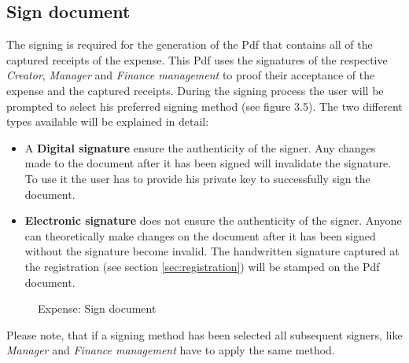 \subsection{Sign document}
\label{sec:signing}
The signing is required for the generation of the Pdf that contains all of the captured receipts of the expense. This Pdf uses the signatures of the respective \textit{Creator}, \textit{Manager} and \textit{Finance management} to proof their acceptance of the expense and the captured receipts. During the signing process the user will be prompted to select his preferred signing method (see figure 3.5). The two different types available will be explained in detail:
\begin{itemize}
    \item A \textbf{Digital signature} ensure the authenticity of the signer. Any changes made to the document after it has been signed will invalidate the signature. To use it the user has to provide his private key to successfully sign the document.
    \item \textbf{Electronic signature} does not ensure the authenticity of the signer. Anyone can theoretically make changes on the document after it has been signed without the signature become invalid. The handwritten signature captured at the registration (see section \ref{sec:registration}) will be stamped on the Pdf document.
\end{itemize}

\begin{figure}[H]
    \centering
    \caption{Expense: Sign document}
    \label{fig:expense-sign}
\end{figure}

Please note, that if a signing method has been selected all subsequent signers, like \textit{Manager} and \textit{Finance management} have to apply the same method.


